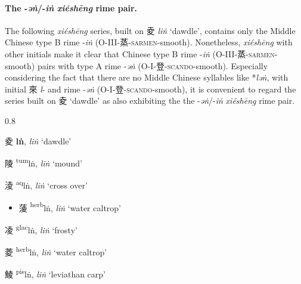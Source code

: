 \paragraph{The -\textit{əṅ}/-\textit{iṅ} \textit{xiéshēng} rime pair.}
\label{par:əng-ing-XS-pair}
The following \textit{xiéshēng} series, built on 夌 \textit{liṅ}   `dawdle', contains only the Middle Chinese type B rime -\textit{iṅ} (O-III-蒸-\textsc{sarmen}-smooth). 
Nonetheless,  \textit{xiéshēng} with other initials make it clear that Chinese type B rime -\textit{iṅ} (O-III-蒸-\textsc{sarmen}-smooth) pairs with type A rime -\textit{əṅ} (O-I-登-\textsc{scando}-smooth). 
Especially considering the fact that there are no Middle Chinese syllables like *\textit{ləṅ}, with initial 來 \textit{l}- and rime -\textit{əṅ} (O-I-登-\textsc{scando}-smooth), it is convenient to regard the series built on 夌 `dawdle' as also exhibiting the the -\textit{əṅ}/-\textit{iṅ} \textit{xiéshēng} rime pair. 

\begin{itemize}
\setlength{\itemsep}{0.2em}
\begin{spacing}{0.8}  
    \item {\Large{夌}} %
    {\large{\textbf{lṅ}}},
    \textit{liṅ} `dawdle' %

    \item {\Large{陵}} %
    {\large{{\textsuperscript{tum}}lṅ}},
    \textit{liṅ} `mound' %

    \item {\Large{淩}} %
    {\large{{\textsuperscript{aq}}lṅ}},
    \textit{liṅ} `cross over' %

\begin{itemize}
\vspace{-2mm}
    \item {\Large{蔆}} %
    {\large{{\textsuperscript{herb}}lṅ}},
    \textit{liṅ} `water caltrop' %
\vspace{-2mm}
\end{itemize}

    \item {\Large{凌}} %
    {\large{{\textsuperscript{glac}}lṅ}},
    \textit{liṅ} `frosty' %

    \item {\Large{菱}} %
    {\large{{\textsuperscript{herb}}lṅ}},
    \textit{liṅ} `water caltrop' %

    \item {\Large{鯪}} %
    {\large{{\textsuperscript{pis}}lṅ}},
    \textit{liṅ} `leviathan carp' %
\end{spacing}
\end{itemize}

